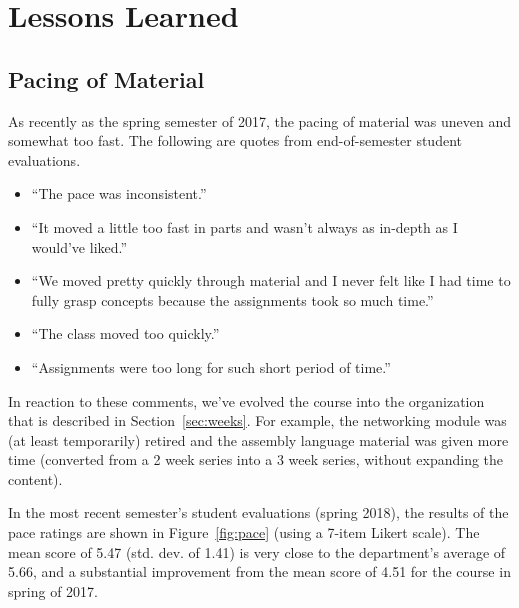 \section{Lessons Learned}
\label{sec:lessons}


\subsection{Pacing of Material}


As recently as the spring semester of 2017, the pacing of material
was uneven and somewhat too fast.  The following are quotes from
end-of-semester student evaluations.
\begin{itemize}
\item ``The pace was inconsistent.''
\item ``It moved a little too fast in parts and wasn't always as
in-depth as I would've liked.''
\item ``We moved pretty quickly through material and I never felt like I had
time to fully grasp concepts because the assignments took so much time.''
\item ``The class moved too quickly.''
\item ``Assignments were too long for such short period of time.''
\end{itemize}
In reaction to these comments, we've evolved the course into the organization
that is described in Section~\ref{sec:weeks}.
For example, the networking module was (at least temporarily) retired
and the assembly language material was given more time (converted from a
2 week series into a 3 week series, without expanding the content).

In the most recent semester's student evaluations (spring 2018),
the results of the pace ratings are shown in Figure~\ref{fig:pace}
(using a 7-item Likert scale).
The mean score of 5.47 (std. dev. of 1.41)
is very close to the department's average of
5.66, and a substantial improvement from the mean score of 4.51
for the course in spring of 2017.

